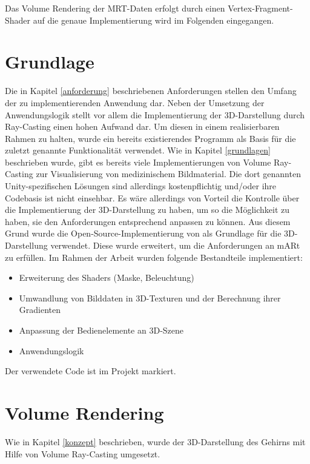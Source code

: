 Das Volume Rendering der MRT-Daten erfolgt durch einen Vertex-Fragment-Shader auf die genaue Implementierung wird im Folgenden eingegangen. 

\section{Grundlage}

Die in Kapitel \ref{anforderung} beschriebenen Anforderungen stellen den Umfang der zu implementierenden Anwendung dar. 
Neben der Umsetzung der Anwendungslogik stellt vor allem die Implementierung der 3D-Darstellung durch Ray-Casting einen hohen Aufwand dar. Um diesen in einem realisierbaren Rahmen zu halten, wurde ein bereits existierendes Programm als Basis für die zuletzt genannte Funktionalität verwendet.
Wie in Kapitel \ref{grundlagen} beschrieben wurde, gibt es bereits viele Implementierungen von Volume Ray-Casting zur Visualisierung von medizinischem Bildmaterial. 
Die dort genannten Unity-spezifischen Lösungen sind allerdings kostenpflichtig und/oder ihre Codebasis ist nicht einsehbar. Es wäre allerdings von Vorteil die Kontrolle über die Implementierung der 3D-Darstellung zu haben, um so die Möglichkeit zu haben, sie den Anforderungen entsprechend anpassen zu können.
Aus diesem Grund wurde die Open-Source-Implementierung von \citet{volumeRenderingGit} als Grundlage für die 3D-Darstellung verwendet. 
Diese wurde erweitert, um die Anforderungen an mARt zu erfüllen. 
Im Rahmen der Arbeit wurden folgende Bestandteile implementiert:

\begin{itemize}
\item Erweiterung des Shaders (Maske, Beleuchtung)
\item Umwandlung von Bilddaten in 3D-Texturen und der Berechnung ihrer Gradienten
\item Anpassung der Bedienelemente an 3D-Szene
\item Anwendungslogik
\end{itemize}
Der verwendete Code ist im Projekt markiert.
\section{Volume Rendering}

Wie in Kapitel \ref{konzept} beschrieben, wurde der 3D-Darstellung des Gehirns mit Hilfe von Volume Ray-Casting umgesetzt. 

